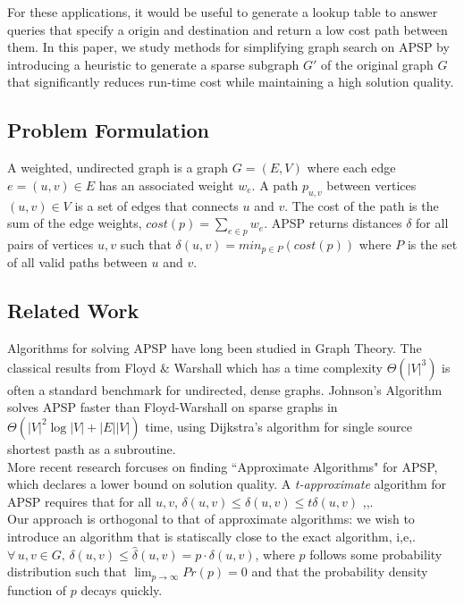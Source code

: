 \documentclass[10.5pt,journal]{IEEEtran}
\begin{document}
 For these applications, it would
be useful to generate a lookup table to answer queries that specify a origin and destination and return a
low cost path between them. In this paper, we study methods for simplifying graph search on APSP by introducing
a heuristic to generate a sparse subgraph $G'$ of the original graph $G$ that significantly reduces run-time
cost while maintaining a high solution quality.

\subsection{Problem Formulation}
	A weighted, undirected graph is a graph $G=(E,V)$ where each edge $e=(u,v)\in E$ has an associated weight
	$w_e$. A path $p_{u,v}$ between vertices $(u,v)\in V$ is a set of edges that connects $u$ and $v$. The cost
	of the path is the sum of the edge weights, $cost(p) = \sum_{e\in p}w_e$. APSP returns distances $\delta$
	for all pairs of vertices $u,v$ such that $\delta(u,v) = min_{p\in P} (cost(p))$ where $P$ is the set of
	all valid paths between $u$ and $v$.

\subsection{Related Work}
	Algorithms for solving APSP have long been studied in Graph Theory. The classical results from
	Floyd \& Warshall \cite{floydWarshall}
	which has a time complexity $\Theta(|V|^3)$ is often a standard benchmark for undirected, dense graphs.
	Johnson's Algorithm
	\cite{johnson}
	solves APSP faster than Floyd-Warshall on sparse graphs in $\Theta(|V|^2 \log|V|+ |E||V|)$ time,
	using Dijkstra's algorithm for single source shortest pasth as a subroutine. \\
	
	More recent research forcuses on finding ``Approximate Algorithms" for APSP, which declares a
	lower bound on solution quality. A {\it{t-approximate}} algorithm for APSP requires that
	for all $u,v$, $\delta(u,v) \le \hat{\delta}(u,v) \le t\delta(u,v)$
	\cite{approx1},\cite{approx2},\cite{neuralNet}. \\
	
	Our approach is orthogonal to that of approximate algorithms: we wish to introduce an algorithm
	that is statiscally close to the exact algorithm, i,e,. $\forall\,u,v \in G,\, 
	\delta(u,v) \le \hat{\delta}(u,v) = p\cdot\delta(u,v)$, where $p$ follows some probability
	distribution such that $\lim_{p\rightarrow\infty}Pr(p) = 0$ and that the probability density function
	of $p$ decays quickly.
	
\end{document}
